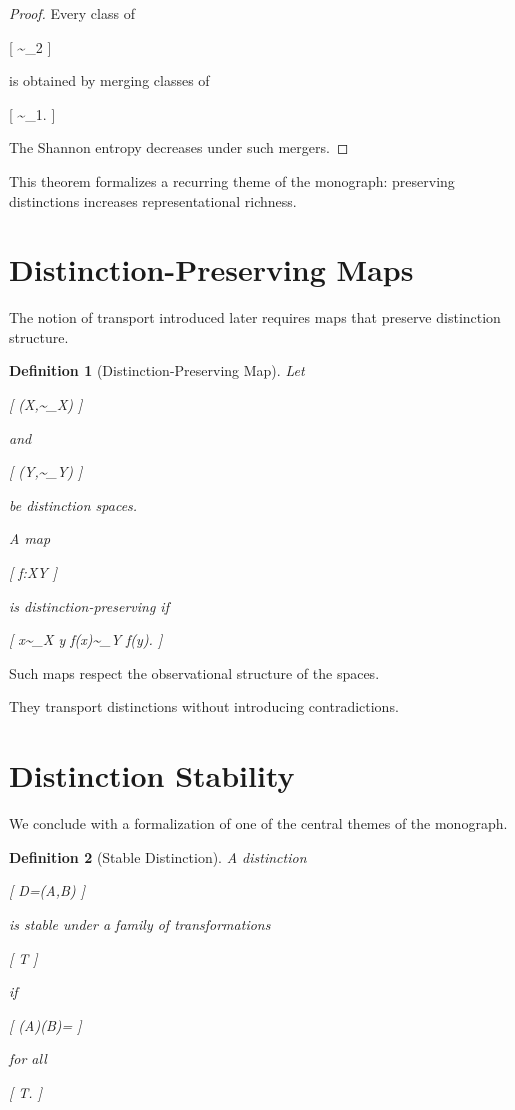 \documentclass[11pt,oneside,openany]{book}
\newtheorem{definition}{Definition}[chapter] \newtheorem{theorem}{Theorem}[chapter] \newtheorem{proposition}{Proposition}[chapter] \newtheorem{lemma}{Lemma}[chapter] \newtheorem{corollary}{Corollary}[chapter] \newtheorem{remark}{Remark}[chapter]
\begin{document}
\begin{proof}

Every class of

[
\sim_2
]

is obtained by merging classes of

[
\sim_1.
]

The Shannon entropy decreases under such mergers.

\end{proof}

This theorem formalizes a recurring theme of the monograph: preserving distinctions increases representational richness.

\section{Distinction-Preserving Maps}

The notion of transport introduced later requires maps that preserve distinction structure.

\begin{definition}[Distinction-Preserving Map]

Let

[
(X,\sim_X)
]

and

[
(Y,\sim_Y)
]

be distinction spaces.

A map

[
f:X\rightarrow Y
]

is distinction-preserving if

[
x\sim_X y
\Longrightarrow
f(x)\sim_Y f(y).
]

\end{definition}

Such maps respect the observational structure of the spaces.

They transport distinctions without introducing contradictions.

\section{Distinction Stability}

We conclude with a formalization of one of the central themes of the monograph.

\begin{definition}[Stable Distinction]

A distinction

[
D=(A,B)
]

is stable under a family of transformations

[
\mathcal T
]

if

[
\tau(A)\cap\tau(B)=\varnothing
]

for all

[
\tau\in\mathcal T.
]

\end{definition}
\end{document}
